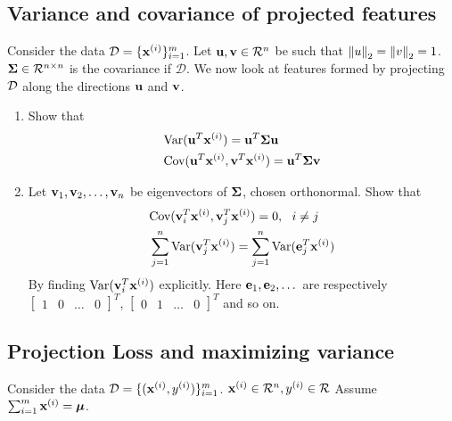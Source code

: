 \subsection{Variance and covariance of projected features}\label{variance_and_covaraince}
Consider the data $\mathcal{D} = \{\mathbf{x}^{(i)}\}_{i = 1}^{m}$. Let $\mathbf{u}, \mathbf{v} \in \mathcal{R}^n$ be such that $\left\lVert u\right\rVert_2 =\left\lVert v\right\rVert_2 = 1$. $\boldsymbol{\Sigma} \in \mathcal{R}^{n \times n}$ is the covariance if $\mathcal{D}$. We now look at features formed by projecting $\mathcal{D}$ along the directions $\mathbf{u}$ and $\mathbf{v}$.

\begin{enumerate}[label=\alph*)]
\item Show that
\begin{align*}
    &\text{Var}(\mathbf{u}^T\mathbf{x}^{(i)})= \mathbf{u}^T\boldsymbol{\Sigma}\mathbf{u}\\
    &\text{Cov}(\mathbf{u}^T\mathbf{x}^{(i)}, \mathbf{v}^T\mathbf{x}^{(i)}) = \mathbf{u}^T\boldsymbol{\Sigma}\mathbf{v}
\end{align*}
\item Let $\mathbf{v}_1, \mathbf{v}_2,\dots,\mathbf{v}_n$ be eigenvectors of $\boldsymbol{\Sigma}$, chosen orthonormal. Show that 
\begin{align*}
    &\text{Cov}(\mathbf{v}^T_i\mathbf{x}^{(i)}, \mathbf{v}^T_j \mathbf{x}^{(i)}) = 0, \ \  i \neq j\\
    &\sum_{j = 1}^{n} \text{Var}(\mathbf{v}^T_j \mathbf{x}^{(i)}) =  \sum_{j = 1}^{n} \text{Var}(\mathbf{e}^T_j \mathbf{x}^{(i)}) 
\end{align*}
By finding $\text{Var}(\mathbf{v}^T_i \mathbf{x}^{(i)})$ explicitly. Here $\mathbf{e}_1, \mathbf{e}_2,\dots$ are respectively $\begin{bmatrix}1 & 0 & \dots & 0\end{bmatrix}^T$, $\begin{bmatrix}0 & 1 & \dots & 0\end{bmatrix}^T$ and so on.
\end{enumerate}

\subsection{Projection Loss and maximizing variance}\label{projection_loss_max_variance}
Consider the data $\mathcal{D} = \{(\mathbf{x}^{(i)}, y^{(i)})\}_{i = 1}^{m}$. $\mathbf{x}^{(i)} \in \mathcal{R}^n, y^{(i)} \in \mathcal{R}$ Assume $\sum_{i = 1}^{m} \mathbf{x}^{(i)} = \boldsymbol{\mu}$.

